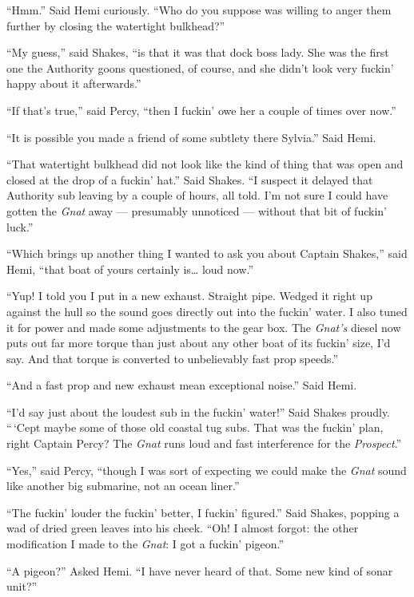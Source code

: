 \documentclass[]{scrbook}
\begin{document}
``Hmm.'' Said Hemi curiously. ``Who do you suppose was willing to anger
them further by closing the watertight bulkhead?''

``My guess,'' said Shakes, ``is that it was that dock boss lady. She was
the first one the Authority goons questioned, of course, and she didn't
look very fuckin' happy about it afterwards.''

``If that's true,'' said Percy, ``then I fuckin' owe her a couple of
times over now.''

``It is possible you made a friend of some subtlety there Sylvia.'' Said
Hemi.

``That watertight bulkhead did not look like the kind of thing that was
open and closed at the drop of a fuckin' hat.'' Said Shakes. ``I suspect
it delayed that Authority sub leaving by a couple of hours, all told.
I'm not sure I could have gotten the \emph{Gnat} away --- presumably
unnoticed --- without that bit of fuckin' luck.''

``Which brings up another thing I wanted to ask you about Captain
Shakes,'' said Hemi, ``that boat of yours certainly is\ldots{} loud
now.''

``Yup! I told you I put in a new exhaust. Straight pipe. Wedged it right
up against the hull so the sound goes directly out into the fuckin'
water. I also tuned it for power and made some adjustments to the gear
box. The \emph{Gnat's} diesel now puts out far more torque than just
about any other boat of its fuckin' size, I'd say. And that torque is
converted to unbelievably fast prop speeds.''

``And a fast prop and new exhaust mean exceptional noise.'' Said Hemi.

``I'd say just about the loudest sub in the fuckin' water!'' Said Shakes
proudly. ``\,`Cept maybe some of those old coastal tug subs. That was
the fuckin' plan, right Captain Percy? The \emph{Gnat} runs loud and
fast interference for the \emph{Prospect}.''

``Yes,'' said Percy, ``though I was sort of expecting we could make the
\emph{Gnat} sound like another big submarine, not an ocean liner.''

``The fuckin' louder the fuckin' better, I fuckin' figured.'' Said
Shakes, popping a wad of dried green leaves into his cheek. ``Oh! I
almost forgot: the other modification I made to the \emph{Gnat}: I got a
fuckin' pigeon.''

``A pigeon?'' Asked Hemi. ``I have never heard of that. Some new kind of
sonar unit?''
\end{document}
